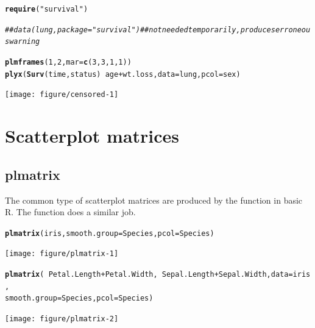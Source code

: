 \documentclass[11pt]{article}\usepackage[]{graphicx}\usepackage[]{color}
\makeatletter
\newcommand{\hlnum}[1]{\textcolor[rgb]{0.686,0.059,0.569}{#1}}%
\newcommand{\hlstr}[1]{\textcolor[rgb]{0.192,0.494,0.8}{#1}}%
\newcommand{\hlcom}[1]{\textcolor[rgb]{0.678,0.584,0.686}{\textit{#1}}}%
\newcommand{\hlopt}[1]{\textcolor[rgb]{0,0,0}{#1}}%
\newcommand{\hlstd}[1]{\textcolor[rgb]{0.345,0.345,0.345}{#1}}%
\newcommand{\hlkwc}[1]{\textcolor[rgb]{0.333,0.667,0.333}{#1}}%
\newcommand{\hlkwd}[1]{\textcolor[rgb]{0.737,0.353,0.396}{\textbf{#1}}}%
\newenvironment{kframe}{%
 \def\at@end@of@kframe{}%
 \ifinner\ifhmode%
  \def\at@end@of@kframe{\end{minipage}}%
  \begin{minipage}{\columnwidth}%
 \fi\fi%
 \def\FrameCommand##1{\hskip\@totalleftmargin \hskip-\fboxsep
 \colorbox{shadecolor}{##1}\hskip-\fboxsep
     \hskip-\linewidth \hskip-\@totalleftmargin \hskip\columnwidth}%
 \MakeFramed {\advance\hsize-\width
   \@totalleftmargin\z@ \linewidth\hsize
   \@setminipage}}%
 {\par\unskip\endMakeFramed%
 \at@end@of@kframe}
\newenvironment{knitrout}{}{} %
\makeatother
\begin{document}
\begin{knitrout}
\color{fgcolor}\begin{kframe}
\begin{alltt}
\hlkwd{require}\hlstd{(}\hlstr{"survival"}\hlstd{)}
\end{alltt}


{\ttfamily\noindent\itshape\color{messagecolor}{\#\# Loading required package: survival}}\begin{alltt}
\hlcom{## data(lung, package="survival")  ## not needed temporarily, produces erroneous warning}

\hlkwd{plmframes}\hlstd{(}\hlnum{1}\hlstd{,}\hlnum{2}\hlstd{,}\hlkwc{mar}\hlstd{=}\hlkwd{c}\hlstd{(}\hlnum{3}\hlstd{,}\hlnum{3}\hlstd{,}\hlnum{1}\hlstd{,}\hlnum{1}\hlstd{))}
\hlkwd{plyx}\hlstd{(}\hlkwd{Surv}\hlstd{(time,status)} \hlopt{~} \hlstd{age}\hlopt{+}\hlstd{wt.loss,} \hlkwc{data}\hlstd{=lung,} \hlkwc{pcol}\hlstd{=sex)}
\end{alltt}
\end{kframe}
\texttt{[image: figure/censored-1]} 
\end{knitrout}


\section{Scatterplot matrices}
\subsection{plmatrix}
The common type of scatterplot matrices are produced by the  function 
in basic R. The function  does a similar job.

\begin{knitrout}
\color{fgcolor}\begin{kframe}
\begin{alltt}
\hlkwd{plmatrix}\hlstd{(iris,} \hlkwc{smooth.group}\hlstd{=Species,} \hlkwc{pcol}\hlstd{=Species)}
\end{alltt}
\end{kframe}
\texttt{[image: figure/plmatrix-1]} 
\begin{kframe}\begin{alltt}
\hlkwd{plmatrix}\hlstd{(}\hlopt{~}\hlstd{Petal.Length}\hlopt{+}\hlstd{Petal.Width,} \hlopt{~}\hlstd{Sepal.Length}\hlopt{+}\hlstd{Sepal.Width,} \hlkwc{data}\hlstd{=iris,}
         \hlkwc{smooth.group}\hlstd{=Species,} \hlkwc{pcol}\hlstd{=Species)}
\end{alltt}
\end{kframe}
\texttt{[image: figure/plmatrix-2]} 
\end{knitrout}
\end{document}

